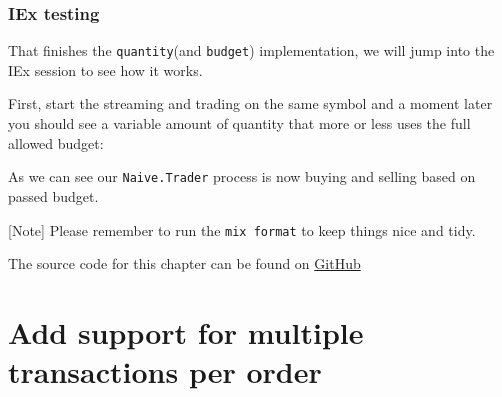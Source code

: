 \documentclass[
  oneside]{book}
\newenvironment{Shaded}{\begin{snugshade}}{\end{snugshade}}
\newcommand{\AttributeTok}[1]{\textcolor[rgb]{0.13,0.29,0.53}{#1}}
\newcommand{\CommentTok}[1]{\textcolor[rgb]{0.56,0.35,0.01}{\textit{#1}}}
\newcommand{\ErrorTok}[1]{\textcolor[rgb]{0.64,0.00,0.00}{\textbf{#1}}}
\newcommand{\ExtensionTok}[1]{#1}
\newcommand{\KeywordTok}[1]{\textcolor[rgb]{0.13,0.29,0.53}{\textbf{#1}}}
\newcommand{\NormalTok}[1]{#1}
\newcommand{\OperatorTok}[1]{\textcolor[rgb]{0.81,0.36,0.00}{\textbf{#1}}}
\newcommand{\PreprocessorTok}[1]{\textcolor[rgb]{0.56,0.35,0.01}{\textit{#1}}}
\newcommand{\SpecialStringTok}[1]{\textcolor[rgb]{0.31,0.60,0.02}{#1}}
\newcommand{\StringTok}[1]{\textcolor[rgb]{0.31,0.60,0.02}{#1}}
\begin{document}
\subsection{IEx testing}\label{iex-testing-2}

That finishes the \texttt{quantity}(and \texttt{budget}) implementation, we will jump into the IEx session to see how it works.

First, start the streaming and trading on the same symbol and a moment later you should see a variable amount of quantity that more or less uses the full allowed budget:

\begin{Shaded}
\end{Shaded}

As we can see our \texttt{Naive.Trader} process is now buying and selling based on passed budget.

{[}Note{]} Please remember to run the \texttt{mix\ format} to keep things nice and tidy.

The source code for this chapter can be found on \href{https://github.com/Cinderella-Man/hands-on-elixir-and-otp-cryptocurrency-trading-bot-source-code/tree/chapter_07}{GitHub}

\chapter{Add support for multiple transactions per order}\label{add-support-for-multiple-transactions-per-order}
\end{document}
